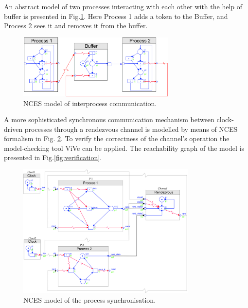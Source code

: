 \begin{bibunit}
An abstract model of two processes interacting with each other with the help of buffer is presented in Fig.\ref{fig:nces_interprocess}. Here Process 1 adds a token to the Buffer, and Process 2 sees it and removes it from the buffer.

\begin{figure}
    \centering
    \includegraphics[width=0.7\textwidth]{MX_Papers/Paper1/images/interprocess.jpg}
    \caption{NCES model of interprocess communication.}
    \label{fig:nces_interprocess}
\end{figure}

A more sophisticated synchronous communication mechanism between clock-driven processes through a rendezvous channel is modelled by means of NCES formalism in Fig. \ref{fig:rendezvous}. To verify the correctness of the channel's operation the model-checking tool ViVe can be applied. The reachability graph of the model is presented in Fig.\ref{fig:verification}. 

\begin{figure}
    \centering
    \includegraphics[width=0.8\textwidth]{MX_Papers/Paper1/images/rendezvous2.jpg}
    \caption{NCES model of the process synchronisation.}
    \label{fig:rendezvous}
\end{figure}


\end{bibunit}
